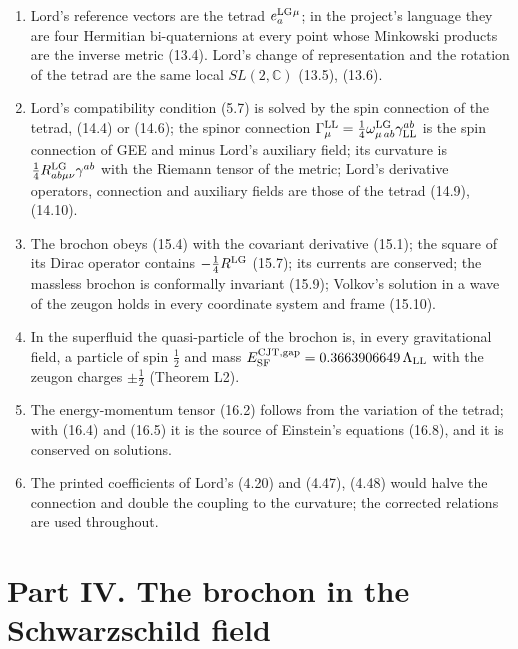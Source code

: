 \documentclass[
  10pt,
]{article}
\providecommand{\tightlist}{%
  \setlength{\itemsep}{0pt}\setlength{\parskip}{0pt}}
\begin{document}
\begin{enumerate}
\def\labelenumi{\arabic{enumi}.}
\tightlist
\item
  Lord's reference vectors are the tetrad \(e^{\rm LG}_a{}^\mu\); in the
  project's language they are four Hermitian bi-quaternions at every
  point whose Minkowski products are the inverse metric (13.4). Lord's
  change of representation and the rotation of the tetrad are the same
  local \(SL(2,\mathbb C)\) (13.5), (13.6).
\item
  Lord's compatibility condition (5.7) is solved by the spin connection
  of the tetrad, (14.4) or (14.6); the spinor connection
  \(\Gamma^{\rm LL}_\mu=\tfrac14\omega^{\rm LG}_{\mu\,ab}\gamma^{ab}_{\rm LL}\)
  is the spin connection of GEE and minus Lord's auxiliary field; its
  curvature is \(\tfrac14R^{\rm LG}_{ab\mu\nu}\gamma^{ab}\) with the
  Riemann tensor of the metric; Lord's derivative operators, connection
  and auxiliary fields are those of the tetrad (14.9), (14.10).
\item
  The brochon obeys (15.4) with the covariant derivative (15.1); the
  square of its Dirac operator contains \(-\tfrac14R^{\rm LG}\) (15.7);
  its currents are conserved; the massless brochon is conformally
  invariant (15.9); Volkov's solution in a wave of the zeugon holds in
  every coordinate system and frame (15.10).
\item
  In the superfluid the quasi-particle of the brochon is, in every
  gravitational field, a particle of spin \(\tfrac12\) and mass
  \(E^{\rm CJT,gap}_{\rm SF}=0.3663906649\,\Lambda_{\rm LL}\) with the
  zeugon charges \(\pm\tfrac12\) (Theorem L2).
\item
  The energy-momentum tensor (16.2) follows from the variation of the
  tetrad; with (16.4) and (16.5) it is the source of Einstein's
  equations (16.8), and it is conserved on solutions.
\item
  The printed coefficients of Lord's (4.20) and (4.47), (4.48) would
  halve the connection and double the coupling to the curvature; the
  corrected relations are used throughout.
\end{enumerate}

\hypertarget{part-iv.-the-brochon-in-the-schwarzschild-field}{%
\section{Part IV. The brochon in the Schwarzschild
field}\label{part-iv.-the-brochon-in-the-schwarzschild-field}}
\end{document}
